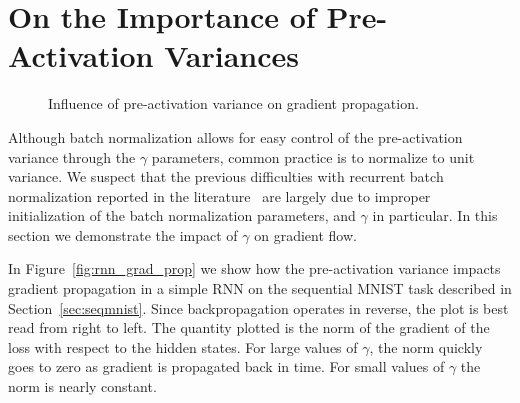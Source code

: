\documentclass{article} %
\begin{document}
\section{On the Importance of Pre-Activation Variances}

\begin{figure}[!ht]
  \center%
  \hspace{2mm}%
  \caption{
Influence of pre-activation variance on gradient propagation.
}
  \label{fig:variance}
\end{figure}

Although batch normalization allows for easy control of the pre-activation variance through the $\gamma$ parameters,
common practice is to normalize to unit variance.
We suspect that the previous difficulties with recurrent batch normalization reported in the literature~\cite{cesar,baidu}
are largely due to improper initialization of the batch normalization parameters, and $\gamma$ in particular.
In this section we demonstrate the impact of $\gamma$ on gradient flow.

In Figure~\ref{fig:rnn_grad_prop} we show how the pre-activation variance impacts gradient propagation in a simple RNN on the sequential MNIST task described in Section~\ref{sec:seqmnist}.
Since backpropagation operates in reverse, the plot is best read from right to left.
The quantity plotted is the norm of the gradient of the loss with respect to the hidden states.
For large values of $\gamma$, the norm quickly goes to zero as gradient is propagated back in time.
For small values of $\gamma$ the norm is nearly constant.
\end{document}
